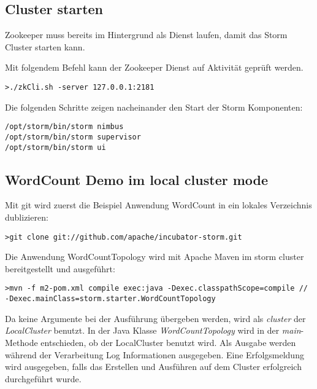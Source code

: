 \subsection{Cluster starten}

Zookeeper muss bereits im Hintergrund als Dienst laufen, damit das Storm Cluster starten kann.

Mit folgendem Befehl kann der Zookeeper Dienst auf Aktivität geprüft werden.
\begin{verbatim}
>./zkCli.sh -server 127.0.0.1:2181 
\end{verbatim}

Die folgenden Schritte zeigen nacheinander den Start der Storm Komponenten:

\begin{verbatim}
/opt/storm/bin/storm nimbus
/opt/storm/bin/storm supervisor
/opt/storm/bin/storm ui
\end{verbatim}


\subsection{WordCount Demo im local cluster mode}

Mit git wird zuerst die Beispiel Anwendung WordCount in ein lokales Verzeichnis dublizieren:

\begin{verbatim}
>git clone git://github.com/apache/incubator-storm.git
\end{verbatim}

Die Anwendung WordCountTopology wird mit Apache Maven im storm cluster bereitgestellt und ausgeführt:

\begin{verbatim}
>mvn -f m2-pom.xml compile exec:java -Dexec.classpathScope=compile //
-Dexec.mainClass=storm.starter.WordCountTopology
\end{verbatim}

Da keine Argumente bei der Ausführung übergeben werden, wird als \textit{cluster} der \textit{LocalCluster} benutzt. In der Java Klasse \textit{WordCountTopology} wird in der \textit{main}-Methode entschieden, ob der LocalCluster benutzt wird. Als Ausgabe werden während der Verarbeitung Log Informationen ausgegeben. Eine Erfolgsmeldung wird ausgegeben, falls das Erstellen und Ausführen auf dem Cluster erfolgreich durchgeführt wurde.
